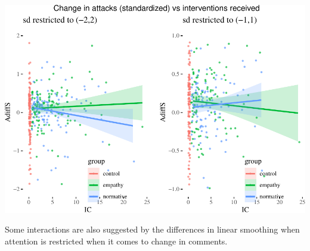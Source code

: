 \documentclass[10pt,dvipsnames,enabledeprecatedfontcommands]{scrartcl}
\begin{document}
\begin{center}\includegraphics[width=1\linewidth]{bayesianReport3_files/figure-latex/ic-1} \end{center}

\normalsize

Some interactions are also suggested by the differences in linear
smoothing when attention is restricted when it comes to change in
comments.

\vspace{1mm} \footnotesize
\end{document}
